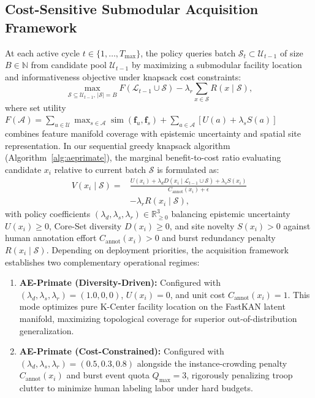 \documentclass[conference]{IEEEtran}
\begin{document}
\subsection{Cost-Sensitive Submodular Acquisition Framework}
\label{sec:policy}
At each active cycle $t \in \{1, \dots, T_{\text{max}}\}$, the policy queries batch $\mathcal{S}_t \subset \mathcal{U}_{t-1}$ of size $B \in \mathbb{N}$ from candidate pool $\mathcal{U}_{t-1}$ by maximizing a submodular facility location and informativeness objective under knapsack cost constraints:
\begin{equation}
  \max_{\mathcal{S} \subseteq \mathcal{U}_{t-1},\, |\mathcal{S}|=B} F(\mathcal{L}_{t-1} \cup \mathcal{S}) - \lambda_r \sum_{x \in \mathcal{S}} R(x \mid \mathcal{S}),
  \label{eq:opt}
\end{equation}
where set utility $F(\mathcal{A}) = \sum_{u \in \mathcal{U}} \max_{s \in \mathcal{A}} \operatorname{sim}(\mathbf{f}_u, \mathbf{f}_s) + \sum_{a \in \mathcal{A}} [ U(a) + \lambda_s S(a) ]$ combines feature manifold coverage with epistemic uncertainty and spatial site representation. In our sequential greedy knapsack algorithm (Algorithm~\ref{alg:aeprimate}), the marginal benefit-to-cost ratio evaluating candidate $x_i$ relative to current batch $\mathcal{S}$ is formulated as:
\begin{equation}
\begin{aligned}
  V(x_i \mid \mathcal{S}) ={}& \frac{U(x_i) + \lambda_d D(x_i \mid \mathcal{L}_{t-1} \cup \mathcal{S}) + \lambda_s S(x_i)}{C_{\text{annot}}(x_i) + \epsilon} \\
  &- \lambda_r R(x_i \mid \mathcal{S}),
\end{aligned}
\label{eq:score}
\end{equation}
with policy coefficients $(\lambda_d, \lambda_s, \lambda_r) \in \mathbb{R}_{\ge 0}^3$ balancing epistemic uncertainty $U(x_i) \ge 0$, Core-Set diversity $D(x_i) \ge 0$, and site novelty $S(x_i) > 0$ against human annotation effort $C_{\text{annot}}(x_i) > 0$ and burst redundancy penalty $R(x_i \mid \mathcal{S})$. Depending on deployment priorities, the acquisition framework establishes two complementary operational regimes:
\begin{enumerate}
  \item \textbf{AE-Primate (Diversity-Driven):} Configured with $(\lambda_d, \lambda_s, \lambda_r) = (1.0, 0, 0)$, $U(x_i)=0$, and unit cost $C_{\text{annot}}(x_i)=1$. This mode optimizes pure K-Center facility location on the FastKAN latent manifold, maximizing topological coverage for superior out-of-distribution generalization.
  \item \textbf{AE-Primate (Cost-Constrained):} Configured with $(\lambda_d, \lambda_s, \lambda_r) = (0.5, 0.3, 0.8)$ alongside the instance-crowding penalty $C_{\text{annot}}(x_i)$ and burst event quota $Q_{\max}=3$, rigorously penalizing troop clutter to minimize human labeling labor under hard budgets.
\end{enumerate}
\end{document}
